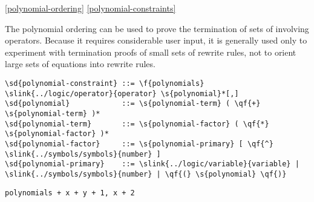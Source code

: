 \ref{polynomial-ordering}
\ref{polynomial-constraints}

The polynomial ordering can be used to prove the termination of sets of 
 involving 
 operators.  Because it 
requires considerable user input, it is generally used only to experiment with
termination proofs of small sets of rewrite rules, not to orient large sets of
equations into rewrite rules.

\begin{verbatim}
\sd{polynomial-constraint} ::= \f{polynomials} \slink{../logic/operator}{operator} \s{polynomial}*[,]
\sd{polynomial}            ::= \s{polynomial-term} ( \qf{+} \s{polynomial-term} )*
\sd{polynomial-term}       ::= \s{polynomial-factor} ( \qf{*} \s{polynomial-factor} )*
\sd{polynomial-factor}     ::= \s{polynomial-primary} [ \qf{^} \slink{../symbols/symbols}{number} ]
\sd{polynomial-primary}    ::= \slink{../logic/variable}{variable} | \slink{../symbols/symbols}{number} | \qf{(} \s{polynomial} \qf{)}
\end{verbatim}

\begin{verbatim}
polynomials + x + y + 1, x + 2
\end{verbatim}

